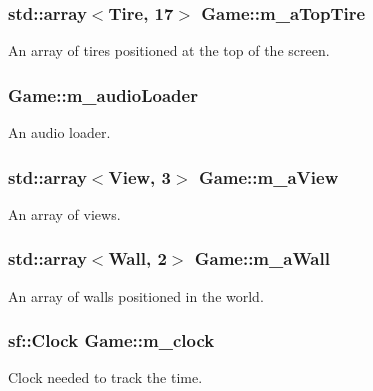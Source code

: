 \subsubsection[{\texorpdfstring{m\+\_\+a\+Top\+Tire}{m_aTopTire}}]{\setlength{\rightskip}{0pt plus 5cm}std\+::array$<${\bf Tire}, 17$>$ Game\+::m\+\_\+a\+Top\+Tire\hspace{0.3cm}{\ttfamily [private]}}\hypertarget{class_game_a3b92928693ffa8c38f8e11c032990def}{}\label{class_game_a3b92928693ffa8c38f8e11c032990def}
An array of tires positioned at the top of the screen. 
\subsubsection[{\texorpdfstring{m\+\_\+audio\+Loader}{m_audioLoader}}]{ Game\+::m\+\_\+audio\+Loader\hspace{0.3cm}{\ttfamily [private]}}\hypertarget{class_game_a4012ccf746dc592aff5ede39df9e2b17}{}\label{class_game_a4012ccf746dc592aff5ede39df9e2b17}
An audio loader. 
\subsubsection[{\texorpdfstring{m\+\_\+a\+View}{m_aView}}]{\setlength{\rightskip}{0pt plus 5cm}std\+::array$<${\bf View}, 3$>$ Game\+::m\+\_\+a\+View\hspace{0.3cm}{\ttfamily [private]}}\hypertarget{class_game_a36d2bed14974b11445cb7a4da0256adf}{}\label{class_game_a36d2bed14974b11445cb7a4da0256adf}
An array of views. 
\subsubsection[{\texorpdfstring{m\+\_\+a\+Wall}{m_aWall}}]{\setlength{\rightskip}{0pt plus 5cm}std\+::array$<${\bf Wall}, 2$>$ Game\+::m\+\_\+a\+Wall\hspace{0.3cm}{\ttfamily [private]}}\hypertarget{class_game_a3baabf1657a540fb01d7c256829f4221}{}\label{class_game_a3baabf1657a540fb01d7c256829f4221}
An array of walls positioned in the world. 
\subsubsection[{\texorpdfstring{m\+\_\+clock}{m_clock}}]{\setlength{\rightskip}{0pt plus 5cm}sf\+::\+Clock Game\+::m\+\_\+clock\hspace{0.3cm}{\ttfamily [private]}}\hypertarget{class_game_afa2b2cd71f1808971458e67a8540a83d}{}\label{class_game_afa2b2cd71f1808971458e67a8540a83d}
Clock needed to track the time. 
